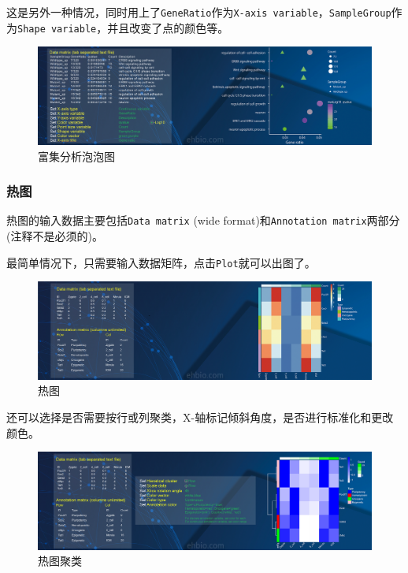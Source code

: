\documentclass[]{article}
\numberwithin{figure}{section}
\numberwithin{table}{section}
\theoremstyle{definition}
\theoremstyle{definition}
\theoremstyle{definition}
\theoremstyle{remark}
\begin{document}
这是另外一种情况，同时用上了\texttt{GeneRatio}作为\texttt{X-axis\ variable}，\texttt{SampleGroup}作为\texttt{Shape\ variable}，并且改变了点的颜色等。

\begin{figure}[H]

{\centering \includegraphics[width=0.95\linewidth,height=0.7\textheight,keepaspectratio]{images/GO_2} 

}

\caption{富集分析泡泡图}\label{fig:unnamed-chunk-249}
\end{figure}

\subsubsection{热图}

热图的输入数据主要包括\texttt{Data\ matrix} (wide
format)和\texttt{Annotation\ matrix}两部分(注释不是必须的)。

最简单情况下，只需要输入数据矩阵，点击\texttt{Plot}就可以出图了。

\begin{figure}[H]

{\centering \includegraphics[width=0.95\linewidth,height=0.7\textheight,keepaspectratio]{images/PHeatmap_1} 

}

\caption{热图}\label{fig:unnamed-chunk-250}
\end{figure}

还可以选择是否需要按行或列聚类，X-轴标记倾斜角度，是否进行标准化和更改颜色。

\begin{figure}[H]

{\centering \includegraphics[width=0.95\linewidth,height=0.7\textheight,keepaspectratio]{images/PHeatmap_2} 

}

\caption{热图聚类}\label{fig:unnamed-chunk-251}
\end{figure}
\end{document}
